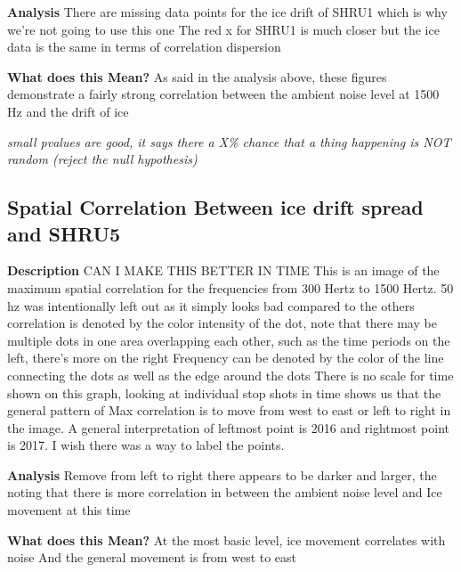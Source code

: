 \textbf{Analysis}
There are missing data points for the ice drift of SHRU1 which is why we’re not going to use this one
The red x for SHRU1 is much closer but the ice data is the same in terms of correlation dispersion

\textbf{What does this Mean?}
As said in the analysis above, these figures demonstrate a fairly strong correlation between the ambient noise level at 1500 Hz and the drift of ice

\textit{small pvalues are good, it says there a X\% chance that a thing happening is NOT random (reject the null hypothesis)}

\subsection{Spatial Correlation Between ice drift spread and SHRU5}

\textbf{Description}
CAN I MAKE THIS BETTER IN TIME
This is an image of the  maximum spatial correlation for the frequencies from 300 Hertz to 1500 Hertz. 50 hz was intentionally left out as it simply looks bad compared to the others
correlation is denoted by the color intensity of the dot, note that there may be multiple dots in one area overlapping each other, such as the time periods on the left, there's more on the right
Frequency can be denoted by the color of the line connecting the dots as well as the edge around the dots
There is no scale for time shown on this graph, looking at individual stop shots in time shows us that the general pattern of Max correlation is to move from west to east or left to right in the image. A general interpretation of leftmost point is 2016 and rightmost point is 2017. I wish there was a way to label the points.  

\textbf{Analysis}
Remove from left to right there appears to be darker and larger, the noting that there is more correlation in between the ambient noise level and Ice movement at this time

\textbf{What does this Mean?}
At the most basic level, ice movement correlates with noise
And the general movement is from west to east

